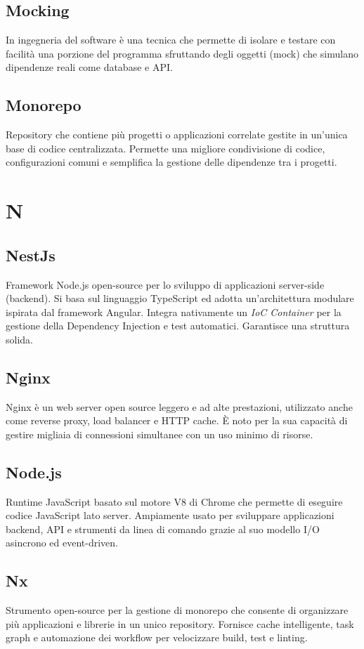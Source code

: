 \documentclass[10pt, letterpaper]{article}
\begin{document}
\subsection*{Mocking}
In ingegneria del software è una tecnica che permette di isolare e testare con facilità una porzione del programma sfruttando degli oggetti (mock) che simulano
dipendenze reali come database e API.

\subsection*{Monorepo}
Repository che contiene più progetti o applicazioni correlate gestite in un'unica base di
codice centralizzata. Permette una migliore condivisione di codice, configurazioni comuni e
semplifica la gestione delle dipendenze tra i progetti.

\section{N}

\subsection*{NestJs}
Framework Node.js open-source per lo sviluppo di applicazioni server-side (backend). Si basa sul linguaggio TypeScript ed adotta un'architettura modulare ispirata dal framework Angular. Integra nativamente un \textit{IoC Container} per la gestione della Dependency Injection e test automatici. Garantisce una struttura solida.

\subsection*{Nginx}
Nginx è un web server open source leggero e ad alte prestazioni, utilizzato anche come reverse proxy,
load balancer e HTTP cache. È noto per la sua capacità di gestire migliaia di connessioni simultanee con un uso minimo di risorse.

\subsection*{Node.js}
Runtime JavaScript basato sul motore V8 di Chrome che permette di eseguire codice JavaScript lato server. Ampiamente usato per sviluppare applicazioni backend, API e strumenti da linea di comando grazie al suo modello I/O asincrono ed event-driven.

\subsection*{Nx}
Strumento open-source per la gestione di monorepo che consente di organizzare più applicazioni e librerie in un unico repository. Fornisce cache intelligente, task graph e automazione dei workflow per velocizzare build, test e linting.
\end{document}
